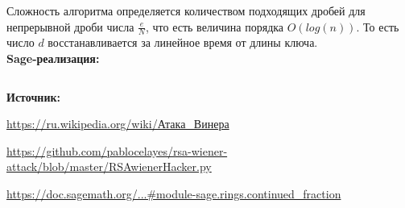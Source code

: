 \documentclass[12pt,a4paper]{scrartcl}
\begin{document}
Сложность алгоритма определяется количеством подходящих дробей для непрерывной дроби числа ${\frac {e}{N}}$, что есть величина порядка $O(log(n))$. То есть число $d$ восстанавливается за линейное время от длины ключа.\\

\textbf{Sage-реализация:}

\inputminted[tabsize=4,obeytabs,fontsize=\footnotesize]{python3}{./RSA_scripts/wiener.sage}

\textbf{Источник:}

\href{https://ru.wikipedia.org/wiki/%D0%90%D1%82%D0%B0%D0%BA%D0%B0_%D0%92%D0%B8%D0%BD%D0%B5%D1%80%D0%B0}{https://ru.wikipedia.org/wiki/Атака\_Винера}
	
\href{https://github.com/pablocelayes/rsa-wiener-attack/blob/master/RSAwienerHacker.py}{https://github.com/pablocelayes/rsa-wiener-attack/blob/master/RSAwienerHacker.py}
	
\href{https://doc.sagemath.org/html/en/reference/diophantine_approximation/sage/rings/continued_fraction.html?highlight=continued_fraction#module-sage.rings.continued_fraction}{https://doc.sagemath.org/...\#module-sage.rings.continued\_fraction}
\end{document}
